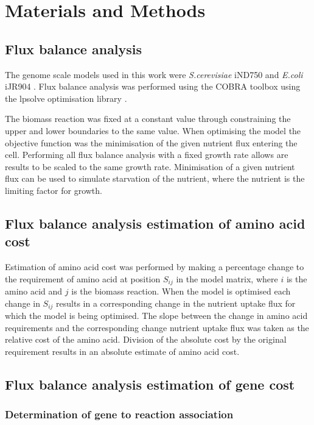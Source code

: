 \section{Materials and Methods}

\subsection{Flux balance analysis}

The genome scale models used in this work were \emph{S.cerevisiae} iND750 \cite{duarte2004a} and \emph{E.coli} iJR904 \cite{reed2003}. Flux balance analysis was performed using the COBRA toolbox \cite{becker2007} using the lpsolve optimisation library \cite{lpsolve}.

The biomass reaction was fixed at a constant value through constraining the upper and lower boundaries to the same value. When optimising the model the objective function was the minimisation of the given nutrient flux entering the cell. Performing all flux balance analysis with a fixed growth rate allows are results to be scaled to the same growth rate. Minimisation of a given nutrient flux can be used to simulate starvation of the nutrient, where the nutrient is the limiting factor for growth.

\subsection{Flux balance analysis estimation of amino acid cost}

Estimation of amino acid cost was performed by making a percentage change to the requirement of amino acid at position $S_{ij}$ in the model matrix, where $i$ is the amino acid and $j$ is the biomass reaction. When the model is optimised each change in $S_{ij}$ results in a corresponding change in the nutrient uptake flux for which the model is being optimised. The slope between the change in amino acid requirements and the corresponding change nutrient uptake flux was taken as the relative cost of the amino acid. Division of the absolute cost by the original requirement results in an absolute estimate of amino acid cost.

\subsection{Flux balance analysis estimation of gene cost}

\subsubsection{Determination of gene to reaction association}

